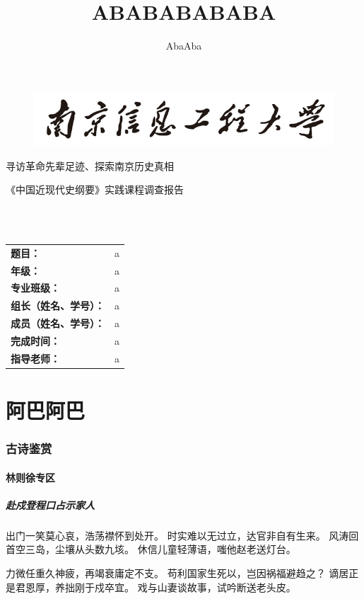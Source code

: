 \documentclass[UTF8]{article}
\title{ABABABABABA}
\author{\textup{AbaAba}}
\begin{document}

\begin{titlepage}
	\begin{figure}[h]
		\centering	
		\includegraphics[width=11.32cm]{./nuist.png}
	\end{figure}
	\linespread{2.0}
	\begin{center}
		\heiti{}寻访革命先辈足迹、探索南京历史真相
	\end{center}
	\begin{center}
		\noindent{}《中国近现代史纲要》实践课程调查报告
	\end{center}
	~\\
	~\\
	\begin{center}
		\begin{tabular}{ll}
			\textbf{题目：}& a \\
			\textbf{年级：}& a \\
			\textbf{专业班级：}& a \\
			\textbf{组长（姓名、学号）：}& a\\
			\textbf{成员（姓名、学号）：}& a\\
			\textbf{完成时间：}& a\\
			\textbf{指导老师：}& a\\
		\end{tabular}
	\end{center}


	\vfill
\end{titlepage}

\part{阿巴阿巴}
\section{古诗鉴赏}
\subsection{林则徐专区}
\subsubsection{赴戍登程口占示家人}

出门一笑莫心哀，浩荡襟怀到处开。
时实难以无过立，达官非自有生来。
风涛回首空三岛，尘壤从头数九垓。
休信儿童轻薄语，嗤他赵老送灯台。

力微任重久神疲，再竭衰庸定不支。
苟利国家生死以，岂因祸福避趋之？
谪居正是君恩厚，养拙刚于戍卒宜。
戏与山妻谈故事，试吟断送老头皮。\cite{linzexu}




\end{document}
